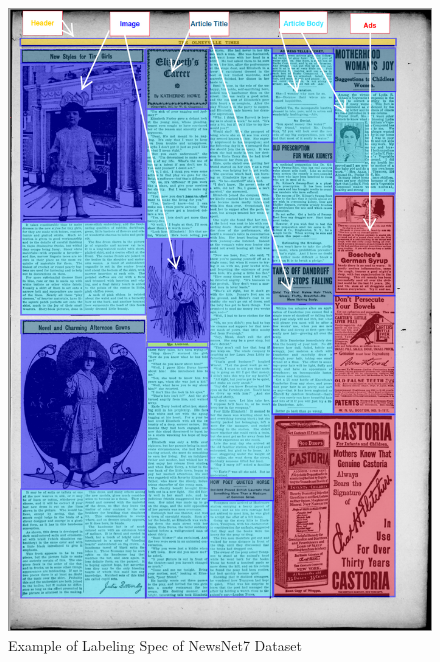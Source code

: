 \documentclass[letterpaper]{article} %
\begin{document}

    
 \begin{figure}[h]
  \centering
  \includegraphics[scale=0.3]{LaTeX/Figures/labeling_example.png}
  \caption{Example of Labeling Spec of NewsNet7 Dataset}
  \label{fig:NewspaperNet15}
 \end{figure}
    
\end{document}
